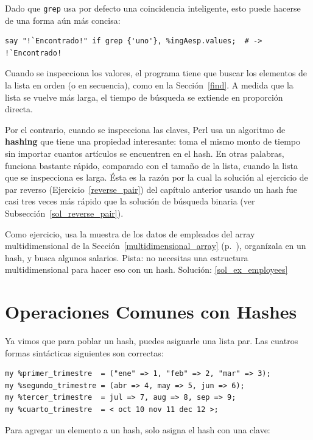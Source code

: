 Dado que {\tt grep}  usa por defecto una coincidencia inteligente, 
esto puede hacerse de una forma aún más concisa:

\begin{lstlisting}
say "!`Encontrado!" if grep {'uno'}, %ingAesp.values;  # -> !`Encontrado!
\end{lstlisting}

Cuando se inspecciona los valores, el programa tiene que buscar 
los elementos de la lista en orden (o en secuencia), como en la
Sección~\ref{find}. A medida que la lista se vuelve más larga, 
el tiempo de búsqueda se extiende en proporción directa.

Por el contrario, cuando se inspecciona las claves, Perl usa
un algoritmo de {\bf hashing} que tiene una propiedad interesante:
toma el mismo monto de tiempo sin importar cuantos artículos
se encuentren en el hash. En otras palabras, funciona bastante 
rápido, comparado con el tamaño de la lista, cuando la lista
que se inspecciona es larga. Ésta es la razón por la cual la
solución al ejercicio de par reverso (Ejercicio~\ref{reverse_pair})
del capítulo anterior usando un hash fue casi tres veces más rápido
que la solución de búsqueda binaria (ver Subsección~\ref{sol_reverse_pair}).

\label{ex_employees}
Como ejercicio, usa la muestra de los datos de empleados del 
array multidimensional  de la Sección~\ref{multidimensional_array}
(p.~\pageref{multidimensional_array}), organízala en un hash, y 
busca algunos salarios. Pista: no necesitas una estructura 
multidimensional para hacer eso con un hash.
Solución: \ref{sol_ex_employees}


\section{Operaciones Comunes con Hashes}

Ya vimos que para poblar un hash, puedes asignarle una lista 
par. Las cuatros formas sintácticas siguientes son correctas:

\begin{lstlisting}
my %primer_trimestre  = ("ene" => 1, "feb" => 2, "mar" => 3);
my %segundo_trimestre = (abr => 4, may => 5, jun => 6);
my %tercer_trimestre  = jul => 7, aug => 8, sep => 9;
my %cuarto_trimestre  = < oct 10 nov 11 dec 12 >;
\end{lstlisting}

Para agregar un elemento a un hash, solo asigna el hash con
una clave:


